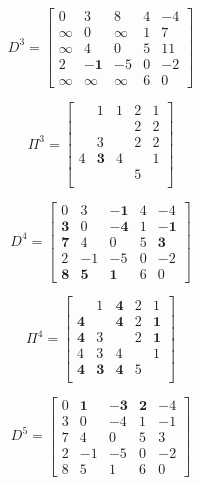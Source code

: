			\begin{equation}
				D^3 = \begin{bmatrix}
					0 & 3 & 8 & 4 & -4 \\
					\infty & 0  &\infty & 1 & 7 \\
					\infty & 4 & 0 & 5 & 11\\
					2 & \mathbf{-1} & -5 & 0 &-2\\
					\infty & \infty & \infty & 6 & 0
				\end{bmatrix}
			\end{equation}

			\begin{equation}
				\Pi^3 = \begin{bmatrix}
					& 1 & 1 & 2 & 1 \\
					& & & 2 & 2\\
					& 3 & & 2 & 2 \\
					4 & \mathbf{3} & 4 & & 1\\
					& & & 5 & \\
				\end{bmatrix}
			\end{equation}

			\begin{equation}
				D^4 = \begin{bmatrix}
					0 & 3 & \mathbf{-1} & 4 & -4 \\
					\mathbf{3} & 0  &\mathbf{-4} & 1 & \mathbf{-1} \\
					\mathbf{7} & 4 & 0 & 5 & \mathbf{3}\\
					2 & -1 & -5 & 0 &-2\\
					\mathbf{8} & \mathbf{5} & \mathbf{1} & 6 & 0
				\end{bmatrix}
			\end{equation}

			\begin{equation}
				\Pi^4 = \begin{bmatrix}
					& 1 & \mathbf{4} & 2 & 1 \\
					\mathbf{4} & & \mathbf{4} & 2 & \mathbf{1}\\
					\mathbf{4} & 3 & & 2 & \mathbf{1} \\
					4 & 3 & 4 & & 1\\
					\mathbf{4} & \mathbf{3} & \mathbf{4} & 5 & \\
				\end{bmatrix}
			\end{equation}

			\begin{equation}
				D^5 = \begin{bmatrix}
					0 & \mathbf{1} & \mathbf{-3} & \mathbf{2} & -4 \\
					3 & 0  & -4 & 1 & -1 \\
					7 & 4 & 0 & 5 & 3\\
					2 & -1 & -5 & 0 &-2\\
					8 & 5 & 1 & 6 & 0
				\end{bmatrix}
			\end{equation}

